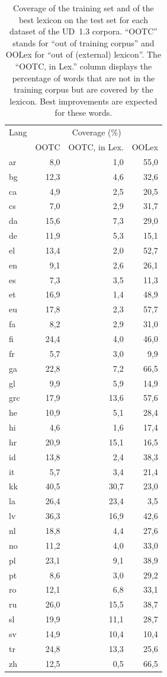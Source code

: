 \documentclass[11pt,a4paper]{article}
\begin{document}
\begin{table}[t]
\centering
\scriptsize
\begin{tabular}{lrrr}
\toprule
Lang & \multicolumn{3}{c}{Coverage (\%)}\\
 & OOTC & OOTC, in Lex. & OOLex\\
\midrule 
ar & 8,0 & 1,0 & 55,0\\
bg & 12,3 & 4,6 & 32,6\\
ca & 4,9 & 2,5 & 20,5\\
cs & 7,0 & 2,9 & 31,7\\
da & 15,6 & 7,3 & 29,0\\
de & 11,9 & 5,3 & 15,1\\
el & 13,4 & 2,0 & 52,7\\
en & 9,1 & 2,6 & 26,1\\
es & 7,3 & 3,5 & 11,3\\
et & 16,9 & 1,4 & 48,9\\
eu & 17,8 & 2,3 & 57,7\\
fa & 8,2 & 2,9 & 31,0\\
fi & 24,4 & 4,0 & 46,0\\
fr & 5,7 & 3,0 & 9,9\\
ga & 22,8 & 7,2 & 66,5\\
gl & 9,9 & 5,9 & 14,9\\
grc & 17,9 & 13,6 & 57,6\\
he & 10,9 & 5,1 & 28,4\\
hi & 4,6 & 1,6 & 17,4\\
hr & 20,9 & 15,1 & 16,5\\
id & 13,8 & 2,4 & 38,3\\
it & 5,7 & 3,4 & 21,4\\
kk & 40,5 & 30,7 & 23,0\\
la & 26,4 & 23,4 & 3,5\\
lv & 36,3 & 16,9 & 42,6\\
nl & 18,8 & 4,4 & 27,6\\
no & 11,2 & 4,0 & 33,0\\
pl & 23,1 & 9,1 & 38,9\\
pt & 8,6 & 3,0 & 29,2\\
ro & 12,1 & 6,8 & 33,1\\
ru & 26,0 & 15,5 & 38,7\\
sl & 19,9 & 11,1 & 28,7\\
sv & 14,9 & 10,4 & 10,4\\
tr & 24,8 & 13,3 & 25,6\\
zh & 12,5 & 0,5 & 66,5\\
\bottomrule
\end{tabular}
\caption{Coverage of the training set and of the best lexicon on the test set for each dataset of the UD~1.3
  corpora. ``OOTC'' stands for ``out of training corpus'' and OOLex for ``out of (external) lexicon''. The ``OOTC, in
  Lex.'' column displays the percentage of words that are not in the training corpus but are covered by the
  lexicon. Best improvements are expected for these words.\label{tbl:coverage}}
\end{table}
\end{document}

